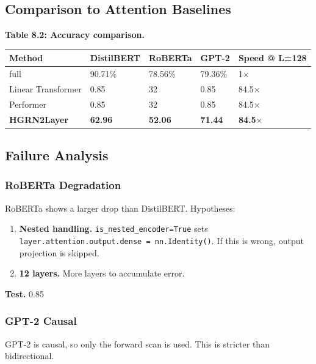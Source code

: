 \subsection{Comparison to Attention Baselines}

\textbf{Table 8.2: Accuracy comparison.}

\begin{table}[H]
\centering
\small
\begin{tabular}{lllll}
\toprule
\textbf{Method} & \textbf{DistilBERT} & \textbf{RoBERTa} & \textbf{GPT-2} & \textbf{Speed @ L=128} \\
\midrule
full & 90.71\% & 78.56\% & 79.36\% & 1$\times$ \\
Linear Transformer & 0.85 & 32 & 0.85 & 84.5$\times$ \\
Performer & 0.85 & 32 & 0.85 & 84.5$\times$ \\
\textbf{HGRN2Layer} & \textbf{62.96} & \textbf{52.06} & \textbf{71.44} & \textbf{84.5$\times$} \\
\bottomrule
\end{tabular}
\end{table}

\subsection{Failure Analysis}

\subsubsection{RoBERTa Degradation}

RoBERTa shows a larger drop than DistilBERT. Hypotheses:

\begin{enumerate}
\item \textbf{Nested handling.} \texttt{is\_nested\_encoder=True} sets
  \texttt{layer.attention.output.dense = nn.Identity()}. If this is wrong,
  output projection is skipped.
\item \textbf{12 layers.} More layers to accumulate error.

\end{enumerate}
\textbf{Test.} 0.85

\subsubsection{GPT-2 Causal}

GPT-2 is causal, so only the forward scan is used. This is stricter than 
bidirectional.

